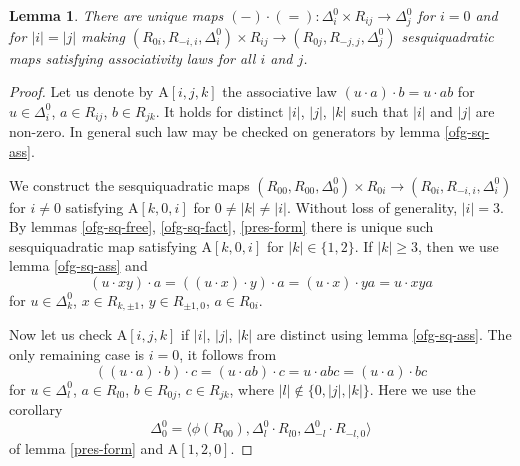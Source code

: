 \documentclass{article}
\newtheorem{lemma}{Lemma}
\theoremstyle{definition}
\begin{document}
\begin{lemma} \label{form-struct}
    There are unique maps \(
        ({-}) \cdot ({=})
        \colon \Delta^0_i \times R_{ij}
        \to \Delta^0_j
    \) for \(i = 0\) and for \(|i| = |j|\) making \(
        (R_{0i}, R_{-i, i}, \Delta^0_i) \times R_{ij}
        \to (R_{0j}, R_{-j, j}, \Delta^0_j)
    \) sesquiquadratic maps satisfying associativity laws for all \(i\) and \(j\).
\end{lemma}
\begin{proof}
    Let us denote by \(
        \mathrm A[i, j, k]
    \) the associative law \(
        (u \cdot a) \cdot b = u \cdot ab
    \) for \(u \in \Delta^0_i\), \(a \in R_{ij}\), \(b \in R_{jk}\). It holds for distinct \(|i|\), \(|j|\), \(|k|\) such that \(|i|\) and \(|j|\) are non-zero. In general such law may be checked on generators by lemma \ref{ofg-sq-ass}.

    We construct the sesquiquadratic maps \(
        (R_{00}, R_{00}, \Delta^0_0) \times R_{0i}
        \to (R_{0i}, R_{-i, i}, \Delta^0_i)
    \) for \(
        i \neq 0
    \) satisfying \(\mathrm A[k, 0, i]\) for \(0 \neq |k| \neq |i|\). Without loss of generality, \(|i| = 3\). By lemmas \ref{ofg-sq-free}, \ref{ofg-sq-fact}, \ref{pres-form} there is unique such sesquiquadratic map satisfying \(\mathrm A[k, 0, i]\) for \(|k| \in \{1, 2\}\). If \(|k| \geq 3\), then we use lemma \ref{ofg-sq-ass} and \[
        (u \cdot xy) \cdot a
        =
        ((u \cdot x) \cdot y) \cdot a
        =
        (u \cdot x) \cdot ya
        =
        u \cdot xya
    \] for \(u \in \Delta^0_k\), \(x \in R_{k, \pm 1}\), \(y \in R_{\pm 1, 0}\), \(a \in R_{0i}\).

    Now let us check \(\mathrm A[i, j, k]\) if \(|i|\), \(|j|\), \(|k|\) are distinct using lemma \ref{ofg-sq-ass}. The only remaining case is \(i = 0\), it follows from \[
        ((u \cdot a) \cdot b) \cdot c
        =
        (u \cdot ab) \cdot c
        =
        u \cdot abc
        =
        (u \cdot a) \cdot bc
    \] for \(u \in \Delta^0_l\), \(a \in R_{l0}\), \(b \in R_{0j}\), \(c \in R_{jk}\), where \(
        |l| \notin \{0, |j|, |k|\}
    \). Here we use the corollary \[
        \Delta^0_0 = \langle
            \phi(R_{00}),
            \Delta^0_l \cdot R_{l0},
            \Delta^0_{-l} \cdot R_{-l, 0}
        \rangle
    \] of lemma \ref{pres-form} and \(\mathrm A[1, 2, 0]\).


\end{proof}
\end{document}
